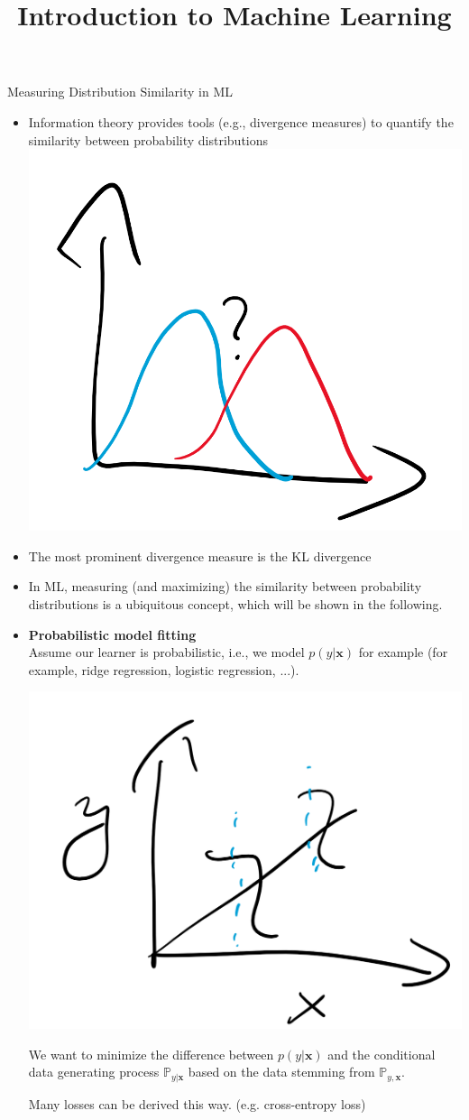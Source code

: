 \documentclass[11pt,compress,t,notes=noshow, xcolor=table]{beamer}
\title{Introduction to Machine Learning}
\date{}
\begin{document}

\begin{vbframe} {Measuring Distribution Similarity in ML}
\begin{itemize}
    \item Information theory provides tools (e.g., divergence measures) to quantify the similarity between probability distributions
\includegraphics[width=0.4\linewidth]{figure_man/kl_ml_dist_sim.png}
    \item The most prominent divergence measure is the KL divergence 
\item In ML, measuring (and maximizing) the similarity between probability distributions is a ubiquitous concept, which will be shown in the following.
\end{itemize}
\framebreak
\begin{itemize}
    \item \textbf{Probabilistic model fitting}\\
Assume our learner is probabilistic, i.e., we model $p(y| \mathbf{x})$ for example (for example, ridge regression, logistic regression, ...).

\includegraphics[width=0.4\linewidth]{figure_man/kl_ml_prob_fit.png}

We want to minimize the difference between $p(y \vert \mathbf{x})$ and the conditional data generating process $\mathbb{P}_{y\vert\mathbf{x}}$ based on the data stemming from $\mathbb{P}_{y, \mathbf{x}}.$

\lz

Many losses can be derived this way. (e.g. cross-entropy loss)


\end{itemize}
\end{vbframe}
\end{document}
